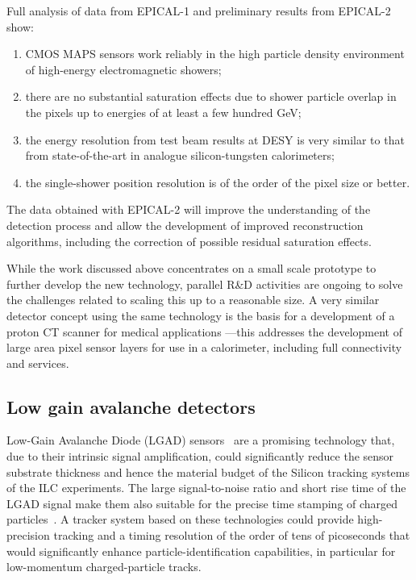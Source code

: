 Full analysis of data from EPICAL-1 and preliminary results from EPICAL-2 show:
\begin{enumerate}
\item CMOS MAPS sensors work reliably in the high particle density environment of high-energy electromagnetic showers;
\item there are no substantial saturation effects due to shower particle overlap in the pixels up to energies of at least a few hundred GeV;
\item the energy resolution from test beam results at DESY is very similar to that from state-of-the-art in analogue silicon-tungsten calorimeters;
\item  the single-shower position resolution is of the order of the pixel size or better.  
\end{enumerate}
The data obtained with EPICAL-2 will improve the understanding of the detection process and allow the development of improved reconstruction algorithms, including the correction of possible residual saturation effects.

While the work discussed above concentrates on a small scale prototype to further develop the new technology, parallel R\&D activities are ongoing to solve the challenges related to scaling this up to a reasonable size. A very similar detector concept using the same technology is the basis for a development of a proton CT scanner for medical applications \cite{Alme2020}---this addresses the development of large area pixel sensor layers for use in a calorimeter, including full connectivity and services.


\subsection{Low gain avalanche detectors}
\label{sec:det-timing}



Low-Gain Avalanche Diode (LGAD) sensors~\cite{Pellegrini:2014lki} are a promising technology that, due to their intrinsic signal amplification, could significantly reduce the sensor substrate thickness and hence the material budget of the Silicon tracking systems of the ILC experiments. The large signal-to-noise ratio and short rise time of the LGAD signal make them also suitable for the precise time stamping of charged particles~\cite{Sadrozinski:2016xxe,Cartiglia:2016voy}. A tracker system based on these technologies could provide high-precision tracking and a timing resolution of the order of tens of picoseconds that would significantly enhance particle-identification capabilities, in particular for low-momentum charged-particle tracks.


